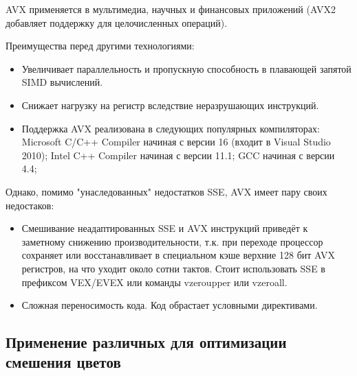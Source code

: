 AVX применяется в мультимедиа, научных и финансовых приложений (AVX2 добавляет поддержку для целочисленных операций).

Преимущества перед другими технологиями:
\begin{itemize}
\item Увеличивает параллельность и пропускную способность в плавающей запятой SIMD вычислений.
\item Снижает нагрузку на регистр вследствие неразрушающих инструкций.
\item Поддержка AVX реализована в следующих популярных компиляторах:
Microsoft C/C++ Compiler начиная с версии 16 (входит в Visual Studio 2010);
Intel C++ Compiler начиная с версии 11.1;
GCC начиная с версии 4.4;
\end{itemize}

Однако, помимо "унаследованных" недостатков SSE, AVX имеет пару своих недостаков:
\begin{itemize}
	\item Смешивание неадаптированных SSE и AVX инструкций приведёт к заметному снижению производительности, т.к. при переходе процессор сохраняет или восстанавливает в специальном кэше верхние 128 бит AVX регистров, на что уходит около сотни тактов. Стоит использовать SSE в префиксом VEX/EVEX или команды vzeroupper или vzeroall.
	\item Сложная переносимость кода. Код обрастает условными директивами. 
\end{itemize}





\subsection{Применение различных для оптимизации смешения цветов}
